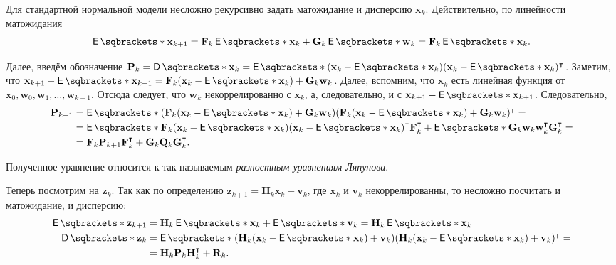 Для стандартной нормальной модели несложно рекурсивно задать матожидание и 
дисперсию \(\mathbf{x}_{k}\). Действительно, по линейности матожидания
\[
	\E{\mathbf{x}_{k + 1}} = \mathbf{F}_{k}\E{\mathbf{x}_{k}} + 
	\mathbf{G}_{k}\E{\mathbf{w}_{k}} = \mathbf{F}_{k}\E{\mathbf{x}_{k}}.
\]

Далее, введём обозначение \(\mathbf{P}_{k} = \D{\mathbf{x}_{k}} = 
\E{(\mathbf{x}_{k} - \E{\mathbf{x}_{k}})(\mathbf{x}_{k} - 
\E{\mathbf{x}_{k}})^{\intercal}}\).  Заметим, что \(\mathbf{x}_{k + 1} - 
\E{\mathbf{x}_{k + 1}}= \mathbf{F}_{k}(\mathbf{x}_{k} - \E{\mathbf{x}_{k}}) + 
\mathbf{G}_{k}\mathbf{w}_{k}\). Далее, вспомним, что \(\mathbf{x}_{k}\) есть 
линейная функция от \(\mathbf{x}_{0}, \mathbf{w}_{0}, \mathbf{w}_{1}, \ldots, 
\mathbf{w}_{k - 1}\). Отсюда следует, что \(\mathbf{w}_{k}\) некоррелированно с 
\(\mathbf{x}_{k}\), а, следовательно, и с \(\mathbf{x}_{k + 1} - 
\E{\mathbf{x}_{k + 1}}\). Следовательно,
\begin{align*}
	\mathbf{P}_{k + 1} &= \E{(\mathbf{F}_{k}(\mathbf{x}_{k} - 
	\E{\mathbf{x}_{k}}) + \mathbf{G}_{k}\mathbf{w}_{k}) 
	(\mathbf{F}_{k}(\mathbf{x}_{k} - \E{\mathbf{x}_{k}}) + 
	\mathbf{G}_{k}\mathbf{w}_{k})^{\intercal}} = \\
	&= \E{\mathbf{F}_{k}(\mathbf{x}_{k} - \E{\mathbf{x}_{k}})(\mathbf{x}_{k} - 
	\E{\mathbf{x}_{k}})^{\intercal}\mathbf{F}_{k}^{\intercal}} + 
	\E{\mathbf{G}_{k}\mathbf{w}_{k}\mathbf{w}_{k}^{\intercal} 
	\mathbf{G}_{k}^{\intercal}} = \\
	&= \mathbf{F}_{k}\mathbf{P}_{k + 1}\mathbf{F}_{k}^{\intercal} + 
	\mathbf{G}_{k}\mathbf{Q}_{k}\mathbf{G}_{k}^{\intercal}.
\end{align*}

Полученное уравнение относится к так называемым \emph{разностным уравнениям 
Ляпунова}.

Теперь посмотрим на \(\mathbf{z}_{k}\). Так как по определению \(\mathbf{z}_{k 
+ 1} = \mathbf{H}_{k}\mathbf{x}_{k} + \mathbf{v}_{k}\), где \(\mathbf{x}_{k}\) 
и \(\mathbf{v}_{k}\) некоррелированны, то несложно посчитать и матожидание, и 
дисперсию:
\begin{align*}
	\E{\mathbf{z}_{k + 1}} &= \mathbf{H}_{k}\E{\mathbf{x}_{k}} + 
	\E{\mathbf{v}_{k}} = \mathbf{H}_{k}\E{\mathbf{x}_{k}} \\
	\D{\mathbf{z}_{k}} &= \E{(\mathbf{H}_{k}(\mathbf{x}_{k} - 
	\E{\mathbf{x}_{k}}) + \mathbf{v}_{k})(\mathbf{H}_{k}(\mathbf{x}_{k} - 
	\E{\mathbf{x}_{k}}) + \mathbf{v}_{k})^{\intercal}} = \\
	&= \mathbf{H}_{k}\mathbf{P}_{k}\mathbf{H}_{k}^{\intercal} + \mathbf{R}_{k}.
\end{align*}

